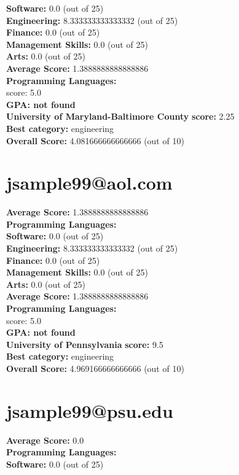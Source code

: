 \documentclass{article}
\begin{document}
\textbf{Software:} 0.0 (out of 25)\\
    \textbf{Engineering: } 8.333333333333332 (out of 25)\\
    \textbf{Finance:} 0.0 (out of 25)\\
    \textbf{Management Skills:} 0.0 (out of 25)\\
    \textbf{Arts:} 0.0 (out of 25)\\
\textbf{Average Score: } 1.3888888888888886\\
\textbf{Programming Languages:} \\
score: 5.0\\
\textbf{GPA: not found}\\
\textbf{University of Maryland-Baltimore County} \textbf{score:} 2.25\\
\textbf{Best category: } engineering\\
    \textbf{Overall Score: }4.081666666666666 (out of 10)\section{jsample99@aol.com}
\textbf{Average Score: } 1.3888888888888886\\
\textbf{Programming Languages:} \\
\textbf{Software:} 0.0 (out of 25)\\
    \textbf{Engineering: } 8.333333333333332 (out of 25)\\
    \textbf{Finance:} 0.0 (out of 25)\\
    \textbf{Management Skills:} 0.0 (out of 25)\\
    \textbf{Arts:} 0.0 (out of 25)\\
\textbf{Average Score: } 1.3888888888888886\\
\textbf{Programming Languages:} \\
score: 5.0\\
\textbf{GPA: not found}\\
\textbf{University of Pennsylvania} \textbf{score:} 9.5\\
\textbf{Best category: } engineering\\
    \textbf{Overall Score: }4.969166666666666 (out of 10)\section{jsample99@psu.edu}
\textbf{Average Score: } 0.0\\
\textbf{Programming Languages:} \\
\textbf{Software:} 0.0 (out of 25)\\
\end{document}
